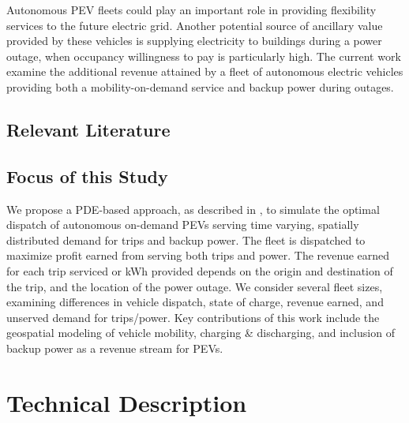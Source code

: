 \documentclass[journal]{IEEEtran}
\begin{document}
Autonomous PEV fleets could play an important role in providing flexibility services to the future electric grid. Another potential source of ancillary value provided by these vehicles is supplying electricity to buildings during a power outage, when occupancy willingness to pay is particularly high. The current work examine the additional revenue attained by a fleet of autonomous electric vehicles providing both a mobility-on-demand service and backup power during outages.

\subsection{Relevant Literature}

\subsection{Focus of this Study}

We propose a PDE-based approach, as described in \cite{lefloch_pde_2016}, to simulate the optimal dispatch of autonomous on-demand PEVs serving time varying, spatially distributed demand for trips and backup power. The fleet is dispatched to maximize profit earned from serving both trips and power. The revenue earned for each trip serviced or kWh provided depends on the origin and destination of the trip, and the location of the power outage. We consider several fleet sizes, examining differences in vehicle dispatch, state of charge, revenue earned, and unserved demand for trips/power. Key contributions of this work include the geospatial modeling of vehicle mobility, charging \& discharging, and inclusion of backup power as a revenue stream for PEVs.

\section{Technical Description}
\end{document}
